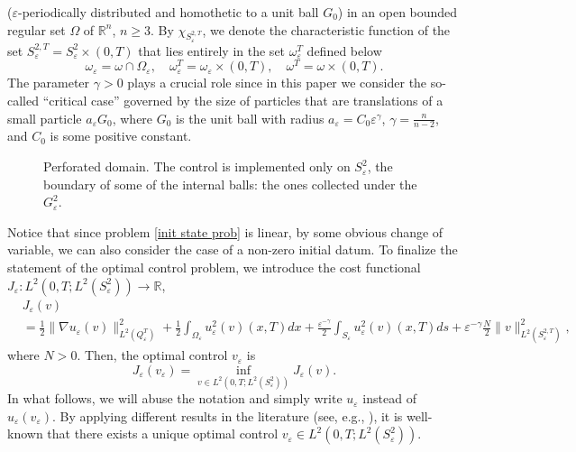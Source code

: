\documentclass[10pt,a4paper]{amsart}
\numberwithin{equation}{section}
\begin{document}
($\varepsilon $-periodically distributed and homothetic to a unit ball $G_0$)
in an open bounded regular set $\Omega $ of $\mathbb{R}^n$, $n\geq 3$.
By $\chi_{S_{\varepsilon }^{2,T}}$, we denote the characteristic function of the set
$S_{\varepsilon }^{2,T}=S_{\varepsilon }^2\times (0,T)$ that lies entirely
in the set $\omega _{\varepsilon }^{T}$ defined below
\[
\omega _{\varepsilon }=\omega \cap \Omega _{\varepsilon },\quad
\omega_{\varepsilon }^{T}=\omega _{\varepsilon }\times (0,T),\quad
\omega^{T}=\omega \times (0,T).
\]
The parameter $\gamma >0$ plays a crucial role since in this paper we
consider the so-called ``critical case''
governed by the size of particles that are translations of a small particle
$a_{\varepsilon }G_0$, where $G_0$ is the unit ball with radius
$a_{\varepsilon }=C_0\varepsilon ^{\gamma }$, $\gamma =\frac{n}{n-2}$, and
$C_0$ is some positive constant.

\begin{figure}[htb]
\centering
 
\caption{Perforated domain. The control is implemented only on
$S_{\varepsilon }^2$, the boundary of some of the internal balls: the ones
collected under the $G^2_\varepsilon$.}
\label{fig: perforated domain}
\end{figure}

Notice that since problem \eqref{init state prob} is linear, by some
obvious change of variable, we can also consider the case of a non-zero
initial datum. To finalize the statement of the optimal control problem, we
introduce the cost functional
$J_{\varepsilon}:L^2(0,T;L^2(S_{\varepsilon }^2))\to \mathbb{R}$,
\begin{equation}
\begin{aligned}
&J_{\varepsilon }(v) \\
&=\frac{1}{2}\| \nabla {u_{\varepsilon }(v)}\|_{L^2(Q_{\varepsilon }^{T})}^2
 +\frac{1}{2}\int _{\Omega_{\varepsilon }}u_{\varepsilon }^2(v)(x,T)dx
+\frac{{\varepsilon }^{-\gamma }}{2}\int _{S_{\varepsilon}}u_{\varepsilon }^2(v)(x,T){ds}
 +\varepsilon ^{-\gamma }\frac{N}{2}\| {v}\| _{L^2(S_{\varepsilon }^{2,T})}^2,
\end{aligned}  \label{cost functional}
\end{equation}
where $N>0$. Then, the optimal control $v_{\varepsilon }$ is
\begin{equation}
J_{\varepsilon }(v_{\varepsilon })
=\inf _{v\in L^2(0,T;L^2(S_{\varepsilon }^2))}J_{\varepsilon }(v).
 \label{optim control def}
\end{equation}
In what follows, we will abuse the notation and simply write
$u_{\varepsilon}$ instead of $u_{\varepsilon }(v_{\varepsilon })$.
By applying different results in the literature
(see, e.g., \cite{LionsOpt,Fursikov2000OptimalCO, Trolstz, Glow-Lions}),
it is well-known that there exists a unique optimal control
$v_{\varepsilon }\in L^2(0,T;L^2(S_{\varepsilon }^2))$.
\end{document}

